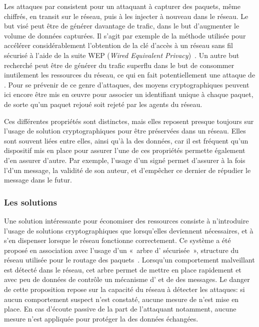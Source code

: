 Les attaques par  consistent pour un attaquant à capturer des paquets, même chiffrés, en transit sur le réseau, puis à les injecter à nouveau dans le réseau.
Le but visé peut être de générer davantage de trafic, dans le but d'augmenter le volume de données capturées.
Il s'agit par exemple de la méthode utilisée pour accélérer considérablement l'obtention de la clé d'accès à un réseau sans fil sécurisé à l'aide de la suite WEP (\textit{Wired Equivalent Privacy})~\cite{BGW01}.
Un autre but recherché peut être de générer du trafic superflu dans le but de consommer inutilement les ressources du réseau, ce qui en fait potentiellement une attaque de \dds.
Pour se prévenir de ce genre d'attaques, des moyens cryptographiques peuvent ici encore être mis en œuvre pour associer un identifiant unique à chaque paquet, de sorte qu'un paquet rejoué soit rejeté par les agents du réseau.

Ces différentes propriétés sont distinctes, mais elles reposent presque toujours sur l'usage de solution cryptographiques pour être préservées dans un réseau.
Elles sont souvent liées entre elles, ainsi qu'à la  des données, car il est fréquent qu'un dispositif mis en place pour assurer l'une de ces propriétés permette également d'en assurer d'autre.
Par exemple, l'usage d'un  signé permet d'assurer à la fois l'\integrite d'un message, la validité de son auteur, et d'empêcher ce dernier de répudier le message dans le futur.

    \subsubsection{Les solutions}
Une solution intéressante pour économiser des ressources consiste à n'introduire l'usage de solutions cryptographiques que lorsqu'elles deviennent nécessaires, et à s'en dispenser lorsque le réseau fonctionne correctement.
Ce système a été proposé en association avec l'usage d'un « arbre d' sécurisée », structure du réseau utilisée pour le routage des paquets~\cite{WDSX07}.
Lorsqu'un comportement malveillant est détecté dans le réseau, cet arbre permet de mettre en place rapidement et avec peu de données de contrôle un mécanisme d' et de  des messages.
Le danger de cette proposition repose sur la capacité du réseau à détecter les attaques: si aucun comportement suspect n'est constaté, aucune mesure de \secu n'est mise en place.
En cas d'écoute passive de la part de l'attaquant notamment, aucune mesure n'est appliquée pour protéger la  des données échangées.

